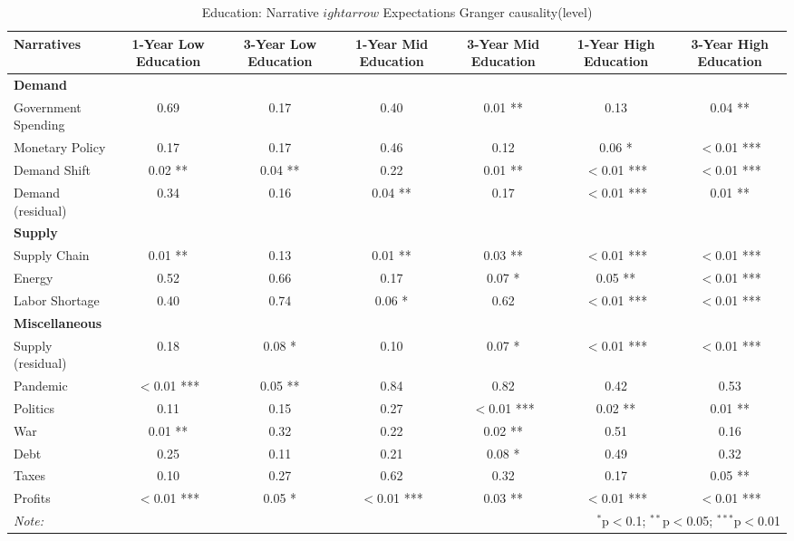 \begin{sidewaystable}[ht]
\centering
\caption{Education: Narrative $
ightarrow$ Expectations Granger causality(level)}\label{table:granger}

\begin{tabular}{lcccccc}
\toprule
\textbf{Narratives} & \textbf{1-Year Low Education} & \textbf{3-Year Low Education} & \textbf{1-Year Mid Education} & \textbf{3-Year Mid Education} & \textbf{1-Year High Education} & \textbf{3-Year High Education} \\
\midrule
\multicolumn{7}{l}{\textbf{Demand}} \\
\midrule
Government Spending & 0.69 & 0.17 & 0.40 & 0.01 ** & 0.13 & 0.04 ** \\
Monetary Policy & 0.17 & 0.17 & 0.46 & 0.12 & 0.06 * & $<$0.01 *** \\
Demand Shift & 0.02 ** & 0.04 ** & 0.22 & 0.01 ** & $<$0.01 *** & $<$0.01 *** \\
Demand (residual) & 0.34 & 0.16 & 0.04 ** & 0.17 & $<$0.01 *** & 0.01 ** \\
\midrule
\multicolumn{7}{l}{\textbf{Supply}} \\
\midrule
Supply Chain & 0.01 ** & 0.13 & 0.01 ** & 0.03 ** & $<$0.01 *** & $<$0.01 *** \\
Energy & 0.52 & 0.66 & 0.17 & 0.07 * & 0.05 ** & $<$0.01 *** \\
Labor Shortage & 0.40 & 0.74 & 0.06 * & 0.62 & $<$0.01 *** & $<$0.01 *** \\
\midrule
\multicolumn{7}{l}{\textbf{Miscellaneous}} \\
\midrule
Supply (residual) & 0.18 & 0.08 * & 0.10 & 0.07 * & $<$0.01 *** & $<$0.01 *** \\
Pandemic & $<$0.01 *** & 0.05 ** & 0.84 & 0.82 & 0.42 & 0.53 \\
Politics & 0.11 & 0.15 & 0.27 & $<$0.01 *** & 0.02 ** & 0.01 ** \\
War & 0.01 ** & 0.32 & 0.22 & 0.02 ** & 0.51 & 0.16 \\
Debt & 0.25 & 0.11 & 0.21 & 0.08 * & 0.49 & 0.32 \\
Taxes & 0.10 & 0.27 & 0.62 & 0.32 & 0.17 & 0.05 ** \\
Profits & $<$0.01 *** & 0.05 * & $<$0.01 *** & 0.03 ** & $<$0.01 *** & $<$0.01 *** \\
\midrule
\bottomrule
\textit{Note:}  & \multicolumn{6}{r}{$^{*}$p$<$0.1; $^{**}$p$<$0.05; $^{***}$p$<$0.01} \\
\bottomrule
\end{tabular}
\end{sidewaystable}
